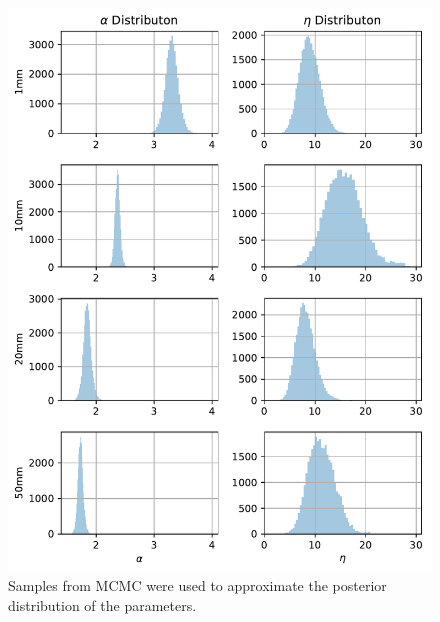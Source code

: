 \documentclass[letterpaper,11pt]{article}
\begin{document}
\begin{enumerate}
\begin{enumerate}
    \begin{figure}
      \centering
      \includegraphics{p2_univariate.pdf}
      \caption{Samples from MCMC were used to approximate the posterior
        distribution of the parameters.}
      \label{fig:p2_univariate}
    \end{figure}


\end{enumerate}
\end{enumerate}
\end{document}
